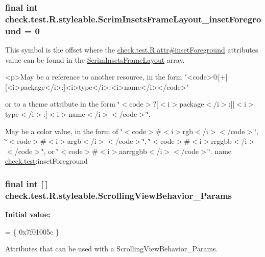\subsubsection[{Scrim\+Insets\+Frame\+Layout\+\_\+inset\+Foreground}]{\setlength{\rightskip}{0pt plus 5cm}final int check.\+test.\+R.\+styleable.\+Scrim\+Insets\+Frame\+Layout\+\_\+inset\+Foreground = 0\hspace{0.3cm}{\ttfamily [static]}}\label{classcheck_1_1test_1_1_r_1_1styleable_a077f41ccea85d0536aa50008070c632e}
This symbol is the offset where the \hyperlink{classcheck_1_1test_1_1_r_1_1attr_adfd84b8f85801bd839c904634053b06f}{check.\+test.\+R.\+attr\#inset\+Foreground} attribute\textquotesingle{}s value can be found in the \hyperlink{classcheck_1_1test_1_1_r_1_1styleable_a864e4953b765cf2c4b15edebf1565653}{Scrim\+Insets\+Frame\+Layout} array.

\begin{DoxyVerb}      <p>May be a reference to another resource, in the form "<code>@[+][<i>package</i>:]<i>type</i>:<i>name</i></code>"
\end{DoxyVerb}
 or to a theme attribute in the form \char`\"{}$<$code$>$?\mbox{[}$<$i$>$package$<$/i$>$\+:\mbox{]}\mbox{[}$<$i$>$type$<$/i$>$\+:\mbox{]}$<$i$>$name$<$/i$>$$<$/code$>$\char`\"{}. 

May be a color value, in the form of \char`\"{}$<$code$>$\#$<$i$>$rgb$<$/i$>$$<$/code$>$\char`\"{}, \char`\"{}$<$code$>$\#$<$i$>$argb$<$/i$>$$<$/code$>$\char`\"{}, \char`\"{}$<$code$>$\#$<$i$>$rrggbb$<$/i$>$$<$/code$>$\char`\"{}, or \char`\"{}$<$code$>$\#$<$i$>$aarrggbb$<$/i$>$$<$/code$>$\char`\"{}.  name \hyperlink{namespacecheck_1_1test}{check.\+test}\+:inset\+Foreground \hypertarget{classcheck_1_1test_1_1_r_1_1styleable_a9b4214227a61058f0ea9bce020f30cad}{}
\subsubsection[{Scrolling\+View\+Behavior\+\_\+\+Params}]{\setlength{\rightskip}{0pt plus 5cm}final int \mbox{[}$\,$\mbox{]} check.\+test.\+R.\+styleable.\+Scrolling\+View\+Behavior\+\_\+\+Params\hspace{0.3cm}{\ttfamily [static]}}\label{classcheck_1_1test_1_1_r_1_1styleable_a9b4214227a61058f0ea9bce020f30cad}
{\bfseries Initial value\+:}
\begin{DoxyCode}
= \{
            0x7f01005c
        \}
\end{DoxyCode}
Attributes that can be used with a Scrolling\+View\+Behavior\+\_\+\+Params. 

